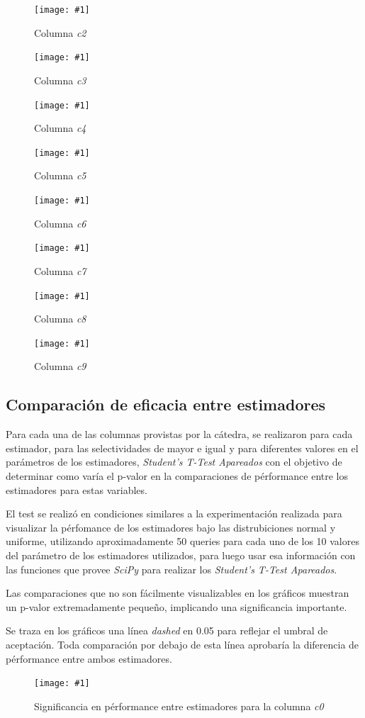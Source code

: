 \documentclass[a4paper, 10pt, twoside]{article}
\newcommand{\grafico}[3]{
  \begin{figure}[H]
    \texttt{[image: \#1]}
    \caption{#2}
    \label{#3}
  \end{figure}
}
\begin{document}
\grafico{dataset-c2}
        {Columna \emph{c2}}
        {dataset-columna-c2}

\grafico{dataset-c3}
        {Columna \emph{c3}}
        {dataset-columna-c3}

\grafico{dataset-c4}
        {Columna \emph{c4}}
        {dataset-columna-c4}

\grafico{dataset-c5}
        {Columna \emph{c5}}
        {dataset-columna-c5}

\grafico{dataset-c6}
        {Columna \emph{c6}}
        {dataset-columna-c6}

\grafico{dataset-c7}
        {Columna \emph{c7}}
        {dataset-columna-c7}

\grafico{dataset-c8}
        {Columna \emph{c8}}
        {dataset-columna-c8}

\grafico{dataset-c9}
        {Columna \emph{c9}}
        {dataset-columna-c9}


\subsection{Comparación de eficacia entre estimadores}
Para cada una de las columnas provistas por la cátedra, se realizaron para cada estimador, para las selectividades de mayor e igual y para diferentes valores en el parámetros de los estimadores, \textit{Student’s T-Test Apareados} con el objetivo de determinar como varía el p-valor en la comparaciones de pérformance entre los estimadores para estas variables.

El test se realizó en condiciones similares a la experimentación realizada para visualizar la pérfomance de los estimadores bajo las distrubiciones normal y uniforme, utilizando aproximadamente 50 queries para cada uno de los 10 valores del parámetro de los estimadores utilizados, para luego usar esa información con las funciones que provee \textit{SciPy} para realizar los \textit{Student’s T-Test Apareados}.

Las comparaciones que no son fácilmente visualizables en los gráficos muestran un p-valor extremadamente pequeño, implicando una significancia importante.

Se traza en los gráficos una línea \textit{dashed} en 0.05 para reflejar el umbral de aceptación. Toda comparación por debajo de esta línea aprobaría la diferencia de pérformance entre ambos estimadores.

\grafico{plot-significance-c0}
        {Significancia en pérformance entre estimadores para la columna \emph{c0}}
        {student-columna-c0}
\end{document}
